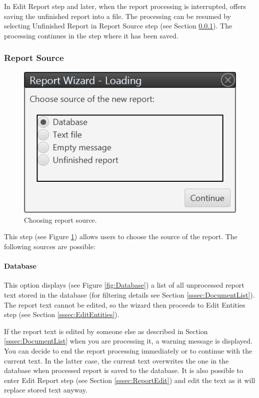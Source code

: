 In Edit Report step and later, when the report processing is interrupted,
\textan{} offers saving the unfinished report into a file. The processing can
be resumed by selecting Unfinished Report in Report Source step (see Section
\ref{sssec:ReportSource}). The processing continues in the step where it has
been saved.

\subsubsection{Report Source}
\label{sssec:ReportSource}

\begin{figure}[!htb]
        \centering
        \includegraphics{Images/source}
        \caption{Choosing report source.}
        \label{fig:Source}
\end{figure}

This step (see Figure \ref{fig:Source}) allows users to choose the source of the
report. The following sources are possible:

\paragraph{Database} This option displays (see Figure \ref{fig:Database}) a list
of all unprocessed report text stored in the database (for filtering details see
Section \ref{sssec:DocumentList}). The report text cannot be edited, so the
wizard then proceeds to Edit Entities step (see Section
\ref{sssec:EditEntities}).

If the report text is edited by someone else as described in Section
\ref{sssec:DocumentList} when you are processing it, a warning message is
displayed. You can decide to end the report processing immediately
or to continue with the current text. In the latter case, the current text
overwrites the one in the database when processed report is saved to the
database. It is also possible to enter Edit Report step (see Section
\ref{sssec:ReportEdit}) and edit the text as it will replace stored text anyway.

